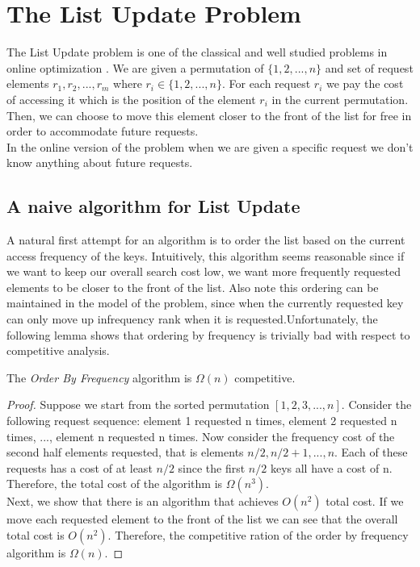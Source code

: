 \section{The List Update Problem}

\noindent 
The List Update problem is one of the classical and well studied problems in online optimization \cite{ST85}. We are given a permutation of $\{ 1,2, ...,n \}$ and set of request elements $r_1, r_2, ..., r_m$ where $r_i \in \{ 1,2,...,n \}$. For each request $r_i$ we pay the cost of accessing it which is the position of the element $r_i$ in the current permutation. Then, we can choose to move this element closer to the front of the list for free in order to accommodate future requests. \\

In the online version of the problem when we are given a specific request we don't know anything about future requests.

\subsection{A naive algorithm for List Update}
A natural first attempt for an algorithm is to order the list based on the current access frequency of the keys.  Intuitively, this algorithm seems reasonable since if we want to keep our overall search cost low, we want more frequently requested elements to be closer to the front of the list.  Also note this ordering can be maintained in the model of the problem, since when the currently requested key can only move up infrequency rank when it is requested.Unfortunately, the following lemma shows that ordering by frequency is trivially bad with respect to competitive analysis.

\begin{lemma}\label{l:frequency_bad}
    The \emph{Order By Frequency} algorithm is $\Omega( n )$ competitive.
\end{lemma}

\begin{proof}
    Suppose we start from the sorted permutation $[ 1,2,3,...,n ]$. Consider the  following request sequence: element 1 requested n times, element 2 requested n times, ..., element n requested n times. Now consider the frequency cost of the second half elements requested, that is elements $n/2, n/2 + 1, ..., n$. Each of these requests has a cost of at least $n/2$ since the first $n/2$ keys all have a cost of n. Therefore, the total cost of the algorithm is $\Omega(n^3)$. \\
    
    Next, we show that there is an algorithm that achieves $O(n^2)$ total cost. If we move each requested element to the front of the list we can see that the overall total cost is $O(n^2)$. Therefore, the competitive ration of the order by frequency algorithm is $\Omega(n)$.
\end{proof}

